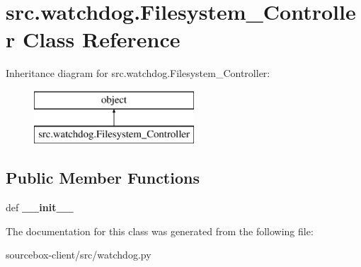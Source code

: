 \hypertarget{classsrc_1_1watchdog_1_1_filesystem___controller}{\section{src.\-watchdog.\-Filesystem\-\_\-\-Controller Class Reference}
\label{classsrc_1_1watchdog_1_1_filesystem___controller}
}
Inheritance diagram for src.\-watchdog.\-Filesystem\-\_\-\-Controller\-:\begin{figure}[H]
\begin{center}
\leavevmode
\includegraphics[height=2.000000cm]{classsrc_1_1watchdog_1_1_filesystem___controller}
\end{center}
\end{figure}
\subsection*{Public Member Functions}
\begin{DoxyCompactItemize}
\item 
\hypertarget{classsrc_1_1watchdog_1_1_filesystem___controller_a69037ccdf91029b3836e15808cb5eefd}{def {\bfseries \-\_\-\-\_\-init\-\_\-\-\_\-}}\label{classsrc_1_1watchdog_1_1_filesystem___controller_a69037ccdf91029b3836e15808cb5eefd}

\end{DoxyCompactItemize}


The documentation for this class was generated from the following file\-:\begin{DoxyCompactItemize}
\item 
sourcebox-\/client/src/watchdog.\-py\end{DoxyCompactItemize}
